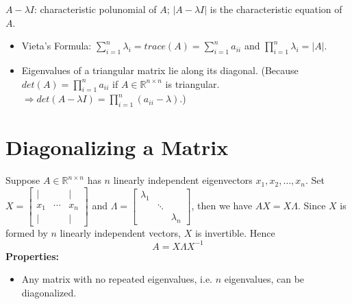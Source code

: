 \documentclass[13pt]{article}
\theoremstyle{definition}
\theoremstyle{remark}
\begin{document}
\begin{multicols}{2}
$A-\lambda I$: characteristic polunomial of $A$; $|A-\lambda I|$ is the characteristic equation of $A$.
\begin{itemize}
    \item Vieta's Formula: $\sum_{i=1}^n \lambda_i = trace(A) = \sum_{i=1}^n a_{ii}$ and $\prod_{i=1}^n \lambda_i = |A|$.
    \item Eigenvalues of a triangular matrix lie along its diagonal. (Because $det(A)=\prod_{i=1}^n a_{ii}$ if $A\in \mathbb{R}^{n\times n}$ is triangular. $\Longrightarrow det(A-\lambda I)=\prod_{i=1}^n (a_{ii}-\lambda)$.)
\end{itemize}

\section{Diagonalizing a Matrix}
Suppose $A\in \mathbb{R}^{n\times n}$ has $n$ linearly independent eigenvectors $x_1, x_2, \ldots, x_n$. Set $X = \begin{bmatrix}
    | &  & |\\
    x_1 & \cdots & x_n\\
    | &  & |
\end{bmatrix}$ and $\Lambda = \begin{bmatrix}
    \lambda_1 &  & \\
     & \ddots &   \\
     &  & \lambda_n
\end{bmatrix}$, then we have $AX = X\Lambda$. Since $X$ is formed by $n$ linearly independent vectors, $X$ is invertible. Hence \[
A = X\Lambda X^{-1}
\]
\textbf{Properties:}
\begin{itemize}
    \item Any matrix with no repeated eigenvalues, i.e. $n$ eigenvalues, can be diagonalized.


\end{itemize}
\end{multicols}
\end{document}
